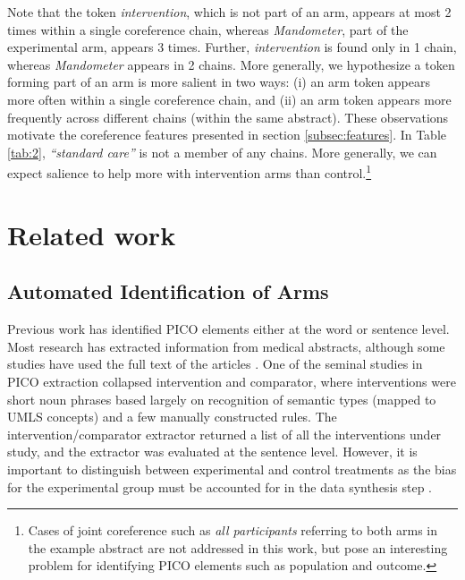 Note that the token \textit{intervention}, which is not part of an arm, appears at most 2 times within a single coreference chain, whereas \textit{Mandometer}, part of the experimental arm, appears 3 times. Further, \textit{intervention} is found only in 1 chain, whereas \textit{Mandometer} appears in 2 chains. More generally, we hypothesize a token forming part of an arm is more salient in two ways: (i) an arm token appears more often within a single coreference chain, and (ii) an arm token appears more frequently across different chains (within the same abstract). These observations motivate the coreference features presented in section \ref{subsec:features}. In Table \ref{tab:2}, \textit{“standard care”} is not a member of any chains. More generally, we can expect salience to help more with intervention arms than control.\footnote{Cases of joint coreference such as \textit{all participants} referring to both arms in the example abstract are not addressed in this work, but pose an interesting problem for identifying PICO elements such as population and outcome.}

\section{Related work}
\subsection{Automated Identification of Arms}

Previous work has identified PICO elements either at the word or sentence level. Most research has extracted information from medical abstracts, although some studies have used the full text of the articles \cite{DeBruijn:2008,Zhao:2012,Wallace:2016}. One of the seminal studies in PICO extraction \cite{Demner:2007} collapsed intervention and comparator, where interventions were short noun phrases based largely on recognition of semantic types (mapped to UMLS concepts) and a few manually constructed rules. The intervention/comparator extractor returned a list of all the interventions under study, and the extractor was evaluated at the sentence level. However, it is important to distinguish between experimental and control treatments as the bias for the experimental group must be accounted for in the data synthesis step \cite{Lumley:2002}. 

